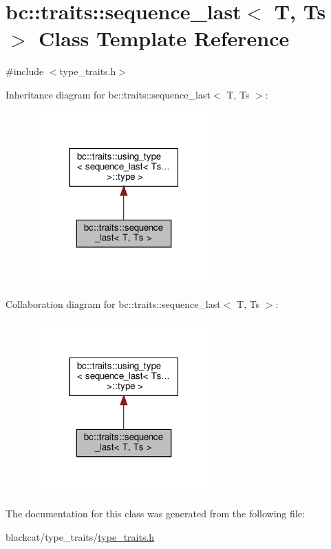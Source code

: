 \hypertarget{classbc_1_1traits_1_1sequence__last}{}\section{bc\+:\+:traits\+:\+:sequence\+\_\+last$<$ T, Ts $>$ Class Template Reference}
\label{classbc_1_1traits_1_1sequence__last}


{\ttfamily \#include $<$type\+\_\+traits.\+h$>$}



Inheritance diagram for bc\+:\+:traits\+:\+:sequence\+\_\+last$<$ T, Ts $>$\+:\nopagebreak
\begin{figure}[H]
\begin{center}
\leavevmode
\includegraphics[width=198pt]{classbc_1_1traits_1_1sequence__last__inherit__graph}
\end{center}
\end{figure}


Collaboration diagram for bc\+:\+:traits\+:\+:sequence\+\_\+last$<$ T, Ts $>$\+:\nopagebreak
\begin{figure}[H]
\begin{center}
\leavevmode
\includegraphics[width=198pt]{classbc_1_1traits_1_1sequence__last__coll__graph}
\end{center}
\end{figure}


The documentation for this class was generated from the following file\+:\begin{DoxyCompactItemize}
\item 
blackcat/type\+\_\+traits/\hyperlink{type__traits_2type__traits_8h}{type\+\_\+traits.\+h}\end{DoxyCompactItemize}

